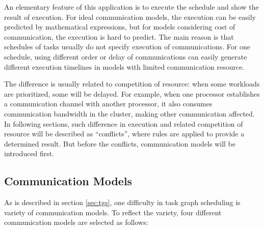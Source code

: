 \documentclass[msc,deptreport, cs]{infthesis}
\begin{document}
An elementary feature of this application is to execute the schedule and show the result of execution. For ideal communication models, the execution can be easily predicted by mathematical expressions, but for models considering cost of communication, the execution is hard to predict. The main reason is that schedules of tasks usually do not specify execution of communications. For one schedule, using different order or delay of communications can easily generate different execution timelines in models with limited communication resource. 

The difference is usually related to competition of resource: when some workloads are prioritized, some will be delayed. For example, when one processor establishes a communication channel with another processor, it also consumes communication bandwidth in the cluster, making other communication affected. In following sections, such difference in execution and related competition of resource will be described as ``conflicts'', where rules are applied to provide a determined result. But before the conflicts, communication models will be introduced first.

\subsection{Communication Models} \label{sec:comm}

As is described in section \ref{sec:tgs}, one difficulty in task graph scheduling is variety of communication models. To reflect the variety, four different communication models are selected as follows:
\end{document}
